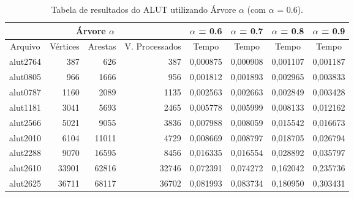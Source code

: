 \documentclass[
	12pt,				%
	oneside,			%
	a4paper,			%
	english,			%
	french,				%
	spanish,			%
	brazil,				%
	]{abntex2}
\begin{document}
\begin{table}[H]
  \centering    
  \begin{tabular}{|c|r|r|r|r|r|r|r|}
    \toprule
    \multicolumn{4}{|c|}{\cellcolor{gray!25}\textbf{Árvore $\alpha$}} & \multicolumn{1}{|c|}{\cellcolor{gray!25}\textbf{$\alpha$ = 0.6}}     & \multicolumn{1}{|c|}{\cellcolor{gray!25}\textbf{$\alpha$ = 0.7}} & \multicolumn{1}{|c|}{\cellcolor{gray!25}\textbf{$\alpha$ = 0.8}} & \multicolumn{1}{|c|}{\cellcolor{gray!25}\textbf{$\alpha$ = 0.9}} \\
    \midrule
    \multicolumn{1}{|c|}{\cellcolor{gray!10}Arquivo} & \multicolumn{1}{|c|}{\cellcolor{gray!10}Vértices} & \multicolumn{1}{|c|}{\cellcolor{gray!10}Arestas} & \multicolumn{1}{|c|}{\cellcolor{gray!10}V. Processados} & 
    \multicolumn{1}{|c|}{\cellcolor{gray!10}Tempo} & \multicolumn{1}{|c|}{\cellcolor{gray!10}Tempo} &
    \multicolumn{1}{|c|}{\cellcolor{gray!10}Tempo} & \multicolumn{1}{|c|}{\cellcolor{gray!10}Tempo} \\
    \hline
    alut2764	&	387	&	626	&	387	&	0,000875	&	0,000908	&	0,001107	&	0,001187	\\
    \hline
    alut0805	&	966	&	1666	&	956	&	0,001812	&	0,001893	&	0,002965	&	0,003833	\\
    \hline
    alut0787	&	1160	&	2089	&	1135	&	0,002563	&	0,002663	&	0,002849	&	0,003428	\\
    \hline
    alut1181	&	3041	&	5693	&	2465	&	0,005778	&	0,005999	&	0,008133	&	0,012162	\\
    \hline
    alut2566	&	5021	&	9055	&	3836	&	0,007988	&	0,008059	&	0,015542	&	0,016673	\\
    \hline
    alut2010	&	6104	&	11011	&	4729	&	0,008669	&	0,008797	&	0,018705	&	0,026794	\\
    \hline
    alut2288	&	9070	&	16595	&	8456	&	0,016335	&	0,016554	&	0,028892	&	0,035797	\\
    \hline
    alut2610	&	33901	&	62816	&	32746	&	0,072391	&	0,074272	&	0,162042	&	0,235736	\\
    \hline
    alut2625	&	36711	&	68117	&	36702	&	0,081993	&	0,083734	&	0,180950	&	0,303431	\\
    \hline
  \end{tabular}
  \caption{Tabela de resultados do ALUT utilizando Árvore $\alpha$ (com $\alpha$ = 0.6).}  
  \label{tab:AlutAlpha0.6}
\end{table}
\end{document}
